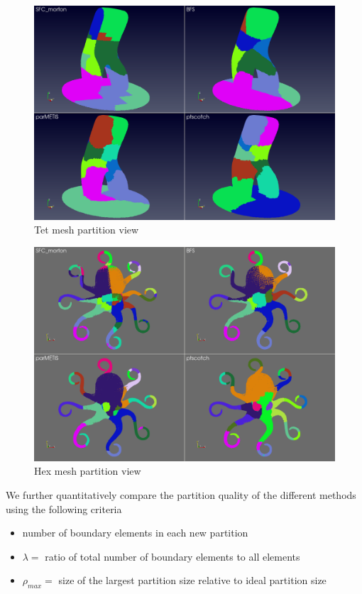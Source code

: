 \documentclass[conference]{IEEEtran}
\begin{document}
\begin{figure}[htbp]
    \centering
    \includegraphics[width=\columnwidth]{figures/tet-mesh-12.png}
    \caption{Tet mesh partition view}
    \label{fig:tet-mesh-12}
\end{figure}

\begin{figure}[htbp]
    \centering
    \includegraphics[width=\columnwidth]{figures/hex-mesh-4.png}
    \caption{Hex mesh partition view}
    \label{fig:hex-mesh-4}
\end{figure}

We further quantitatively compare the partition quality of the different methods using the following criteria
\begin{itemize}
    \item number of boundary elements in each new partition 
    \item $\lambda = $ ratio of total number of boundary elements to all elements
    \item $\rho_{max} = $ size of the largest partition size relative to ideal partition size
\end{itemize}
\end{document}
